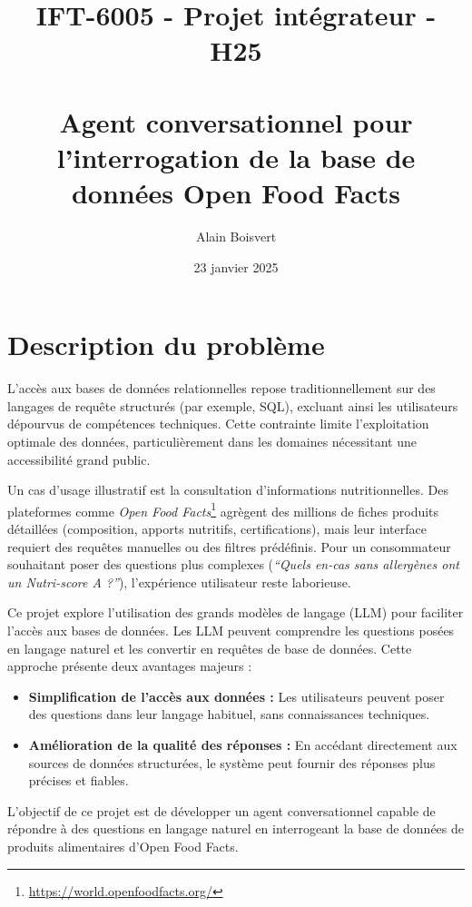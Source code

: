 \documentclass[a4paper,11pt]{article}
\title{IFT-6005 - Projet intégrateur - H25 \\ ~ \\ Agent conversationnel pour l'interrogation de la base de données Open Food Facts}
\author{Alain Boisvert}
\date{23 janvier 2025}
\begin{document}

\newpage

\section{Description du problème}  
\label{sec:probleme}

L'accès aux bases de données relationnelles repose traditionnellement sur des langages de requête structurés (par exemple, SQL),
excluant ainsi les utilisateurs dépourvus de compétences techniques. Cette contrainte limite l'exploitation optimale des
données, particulièrement dans les domaines nécessitant une accessibilité grand public.

Un cas d'usage illustratif est la consultation d'informations nutritionnelles. Des plateformes comme \textit{Open Food Facts}\footnote{\url{https://world.openfoodfacts.org/}}
agrègent des millions de fiches produits détaillées (composition, apports nutritifs, certifications), mais leur
interface requiert des requêtes manuelles ou des filtres prédéfinis. Pour un consommateur souhaitant poser des questions
plus complexes (\textit{\enquote{Quels en-cas sans allergènes ont un Nutri-score A ?}}), l'expérience utilisateur reste laborieuse.

Ce projet explore l'utilisation des grands modèles de langage (LLM) pour faciliter l'accès aux bases de données.
Les LLM peuvent comprendre les questions posées en langage naturel et les convertir en requêtes de base de données. Cette approche présente deux avantages majeurs :


\begin{itemize}
\item \textbf{Simplification de l'accès aux données :} Les utilisateurs peuvent poser des questions dans leur langage habituel, sans connaissances techniques.
\item \textbf{Amélioration de la qualité des réponses :} En accédant directement aux sources de données structurées, le système peut fournir des réponses plus précises et fiables.
\end{itemize}

L'objectif de ce projet est de développer un agent conversationnel capable de répondre à des questions en langage naturel en interrogeant la base de données de produits alimentaires
d'Open Food Facts.
\end{document}
